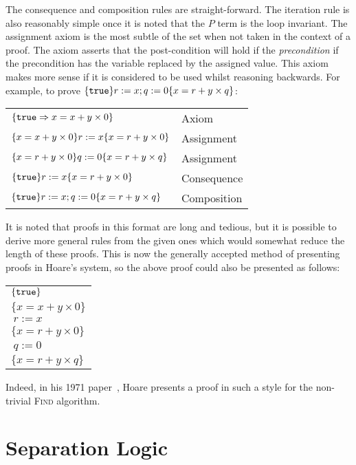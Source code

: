 \documentclass[a4paper]{report}
\begin{document}
  The consequence and composition rules are straight-forward. The iteration rule
  is also reasonably simple once it is noted that the $P$ term is the loop
  invariant. The assignment axiom is the most subtle of the set when not taken
  in the context of a proof. The axiom asserts that the post-condition will hold
  if the \emph{precondition} if the precondition has the variable replaced by
  the assigned value. This axiom makes more sense if it is considered to be used
  whilst reasoning backwards. For example, to prove $\{\texttt{true}\}r := x; q :=
  0\{x = r + y \times q\}$:

  \begin{tabular}{ll}
    $\{\texttt{true} \Rightarrow x = x + y \times 0 \}$ & Axiom \\
    $\{x = x + y \times 0\}r:=x\{x = r + y \times 0\}$ & Assignment \\
    $\{x = r + y \times 0\}q:=0\{x = r + y \times q\}$ & Assignment \\
    $\{\texttt{true}\}r:=x\{x = r + y \times 0\}$ & Consequence \\
    $\{\texttt{true}\}r:=x; q:=0\{x = r + y \times q\}$ & Composition\\
  \end{tabular}

  It is noted that proofs in this format are long and tedious, but it is
  possible to derive more general rules from the given ones which would somewhat
  reduce the length of these proofs. This is now the generally accepted method
  of presenting proofs in Hoare's system, so the above proof could also be
  presented as follows:

  \begin{tabular}{l}
    $\{\texttt{true}\}$ \\
    $\{x = x + y \times 0\}$ \\
    $\ r:=x$ \\
    $\{x = r + y \times 0\}$ \\
    $\ q:=0$ \\
    $\{x = r + y \times q\}$
  \end{tabular}

  Indeed, in his 1971 paper~\cite{Hoare1971proof}, Hoare presents a proof in
  such a style for the non-trivial \textsc{Find} algorithm.


\section{Separation Logic}
\end{document}
